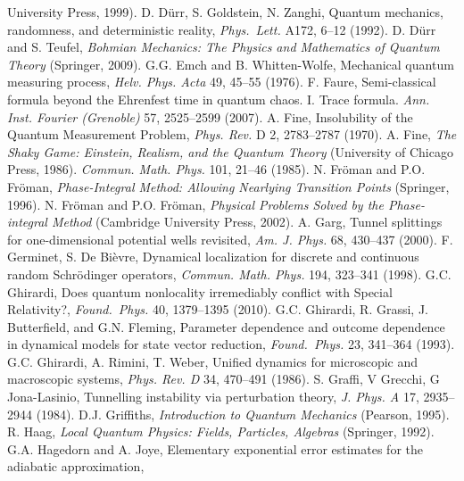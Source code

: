 \documentclass[12pt]{article}
\begin{document}
\begin{thebibliography}{99}
\begin{footnotesize}
University Press, 1999).
   D. D\"{u}rr, S. Goldstein, N. Zanghi, Quantum mechanics, randomness, and deterministic reality,
 \emph{Phys.\ Lett.} A172, 6--12 (1992).
  D. D\"{u}rr and  S. Teufel, \emph{Bohmian Mechanics: The Physics and Mathematics of Quantum Theory} (Springer, 2009). 
 G.G. Emch and B. Whitten-Wolfe, Mechanical quantum measuring process,   \emph{Helv. Phys. Acta}  49, 45--55 (1976). 
 F. Faure, Semi-classical formula beyond the Ehrenfest time in quantum chaos. I. Trace formula. \emph{Ann. Inst. Fourier (Grenoble)} 57, 2525--2599 (2007).
 A. Fine, Insolubility of the Quantum Measurement Problem,  \emph{Phys. Rev.} D 2, 2783--2787 (1970).
 A. Fine, \emph{The Shaky Game: Einstein, Realism, and the Quantum Theory} (University of Chicago Press, 1986).
 \emph{Commun. Math.  Phys.} 101, 21--46 (1985).
 N. Fr{\"o}man and P.O. Fr{\"o}man, \emph{Phase-Integral Method: Allowing Nearlying Transition Points}
(Springer, 1996). 
 N. Fr{\"o}man and P.O. Fr{\"o}man, \emph{Physical Problems Solved by the Phase-integral Method} (Cambridge University Press, 2002). 
 A. Garg, Tunnel splittings for one-dimensional potential wells revisited,  \emph{Am. J. Phys.} 68, 430--437 (2000).
 F. Germinet, S. De Bi\`{e}vre, Dynamical localization for discrete and 
continuous random Schr\"{o}dinger operators,  \emph{Commun. Math.  Phys.}
194, 323--341 (1998).
  G.C. Ghirardi, Does quantum nonlocality irremediably conflict with Special Relativity?,
 \emph{Found.\ Phys.} 40, 1379--1395 (2010). 
  G.C. Ghirardi, R. Grassi, J. Butterfield, and G.N. Fleming, Parameter dependence and outcome dependence in dynamical models for state vector reduction,  \emph{Found.\ Phys.} 23, 341--364 (1993). 
 G.C. Ghirardi, A. Rimini, T. Weber, Unified dynamics for microscopic and macroscopic systems, 
\emph{ Phys. Rev. D} 34, 470--491 (1986).
 S. Graffi, V Grecchi, G Jona-Lasinio, Tunnelling instability via perturbation theory, \emph{J. Phys. A} 17, 2935--2944
(1984). 
 D.J. Griffiths, \emph{Introduction to Quantum Mechanics} (Pearson, 1995). 
  R. Haag,   {\it Local Quantum Physics: Fields, Particles, Algebras} (Springer, 1992).  
 G.A. Hagedorn and A. Joye, Elementary exponential error estimates for the adiabatic approximation, 

\end{footnotesize}
\end{thebibliography}
\end{document}
